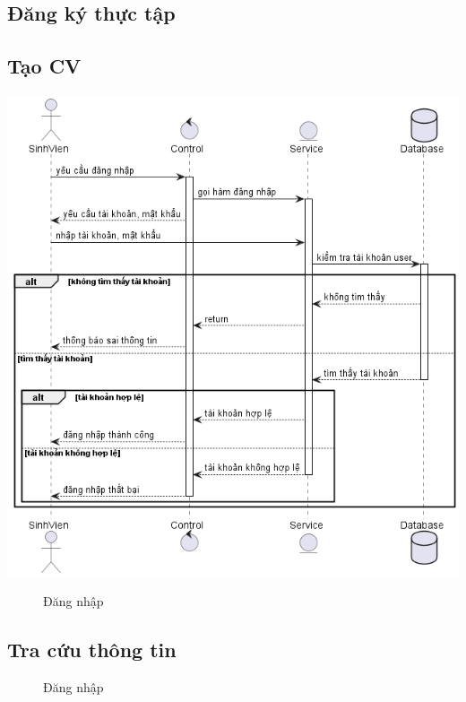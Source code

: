 \subsection{Đăng ký thực tập}
\subsection{Tạo CV}
  \begin{center}
    \includegraphics[width=1.1\textwidth]{image/sequence/login.png}
    \begin{figure}
      \centering
      \caption{Đăng nhập}
    \end{figure}
  \end{center}

\subsection{Tra cứu thông tin}
  \begin{center}
    \begin{figure}
      \centering
      \caption{Đăng nhập}
    \end{figure}
  \end{center}